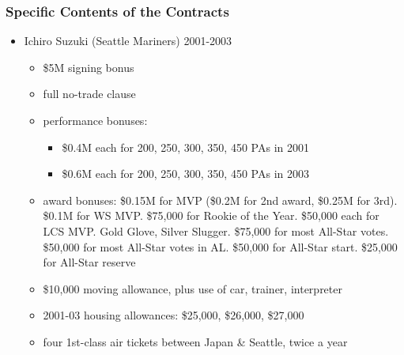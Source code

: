 \documentclass[dvipdfmx,12pt]{beamer}
\begin{document}
\begin{frame}\frametitle{Specific Contents of the Contracts}
\begin{itemize}
  \item Ichiro Suzuki (Seattle Mariners) 2001-2003
  \begin{itemize}
    \item \$5M signing bonus

    \item full no-trade clause

    \item performance bonuses:
     \begin{itemize}
       \item \$0.4M each for 200, 250, 300, 350, 450 PAs in 2001

       \item \$0.6M each for 200, 250, 300, 350, 450 PAs in 2003
     \end{itemize}

    \item award bonuses: \$0.15M for MVP
    (\$0.2M for 2nd award, \$0.25M for 3rd). \$0.1M for WS MVP.
     \$75,000 for Rookie of the Year. \$50,000 each for LCS MVP. Gold Glove,
      Silver Slugger. \$75,000 for most All-Star votes.
      \$50,000 for most All-Star votes in AL. \$50,000 for All-Star start.
       \$25,000 for All-Star reserve

    \item \$10,000 moving allowance, plus use of car, trainer, interpreter

    \item 2001-03 housing allowances: \$25,000, \$26,000, \$27,000

    \item four 1st-class air tickets between Japan & Seattle, twice a year
  \end{itemize}
\end{itemize}
\end{frame}
\end{document}
